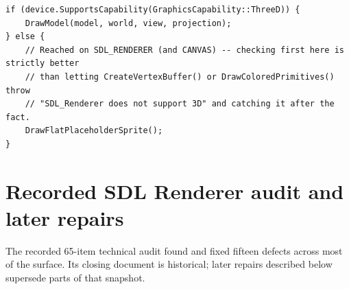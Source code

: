 \begin{lstlisting}
if (device.SupportsCapability(GraphicsCapability::ThreeD)) {
    DrawModel(model, world, view, projection);
} else {
    // Reached on SDL_RENDERER (and CANVAS) -- checking first here is strictly better
    // than letting CreateVertexBuffer() or DrawColoredPrimitives() throw
    // "SDL_Renderer does not support 3D" and catching it after the fact.
    DrawFlatPlaceholderSprite();
}
\end{lstlisting}

\section{Recorded SDL Renderer audit and later repairs}
\label{sec:phase70-audit-bugs}

The recorded 65-item technical audit found and fixed fifteen defects across most of the
 surface. Its closing document is historical; later repairs described
below supersede parts of that snapshot.

